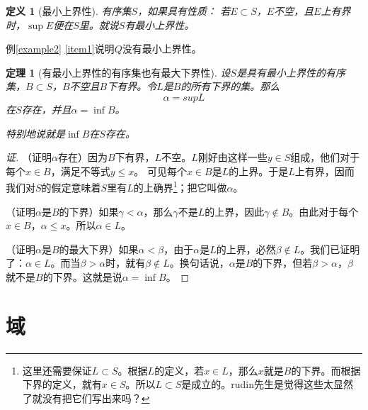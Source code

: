 \documentclass[a4paper,UTF8]{ctexbook}
\newtheorem{definition}{定义}[chapter]
\newtheorem{theorem}{定理}[chapter]
\begin{document}
\begin{definition}[最小上界性]
有序集$S$，如果具有性质：
若$E \subset S$，$E$不空，且$E$上有界时，$\sup{E}$便在$S$里。就说$S$有最小上界性。
\end{definition}
例\ref{example2} \ref{item1}说明$Q$没有最小上界性。

\begin{theorem}[有最小上界性的有序集也有最大下界性]
设$S$是具有最小上界性的有序集，$B \subset S$，$B$不空且$B$下有界。令$L$是$B$的所有下界的集。那么$$\alpha = sup{L}$$在$S$存在，并且$\alpha = \inf{B}$。

特别地说就是$\inf{B}$在$S$存在。
\end{theorem}

\begin{proof}[证]
（证明$\alpha$存在）因为$B$下有界，$L$不空。$L$刚好由这样一些$y \in S$组成，他们对于每个$x \in B$，满足不等式$y \leqslant x$。
可见每个$x \in B$是$L$的上界。于是$L$上有界，因而我们对$S$的假定意味着$S$里有$L$的上确界\footnote{这里还需要保证$L \subset S$。根据$L$的定义，若$x \in L$，那么$x$就是$B$的下界。而根据下界的定义，就有$x \in S$。所以$L \subset S$是成立的。rudin先生是觉得这些太显然了就没有把它们写出来吗？}；把它叫做$\alpha$。

（证明$\alpha$是$B$的下界）如果$\gamma < \alpha$，那么$\gamma$不是$L$的上界，因此$\gamma \notin B$。由此对于每个$x \in B$，$\alpha \leqslant x$。所以$\alpha \in L$。

（证明$\alpha$是$B$的最大下界）如果$\alpha < \beta$，由于$\alpha$是$L$的上界，必然$\beta \notin L$。我们已证明了：$\alpha \in L$。而当$\beta > \alpha$时，就有$\beta \notin L$。换句话说，$\alpha$是$B$的下界，但若$\beta > \alpha$，$\beta$就不是$B$的下界。这就是说$\alpha = \inf{B}$。
\end{proof}

\section{域}
\end{document}
